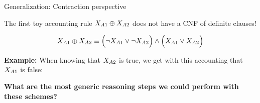 \documentclass{beamer}
\begin{document}
    \begin{frame}{Generalization: Contraction perspective}

        The first toy accounting rule $X_{A1}\oplus X_{A2}$ does not have a CNF of definite clauses!

        \begin{align*}
            X_{A1}\oplus X_{A2}
            \equiv
            \Big(\lnot X_{A1}\lor\lnot X_{A2} \Big) \land \Big(X_{A1}\lor X_{A2} \Big)
        \end{align*}

            {\bf Example:} When knowing that $X_{A2}$ is true, we get with this accounting that $X_{A1}$ is false:

        \begin{center}
            \bf What are the most generic reasoning steps we could perform with these schemes?
        \end{center}
    \end{frame}
\end{document}
